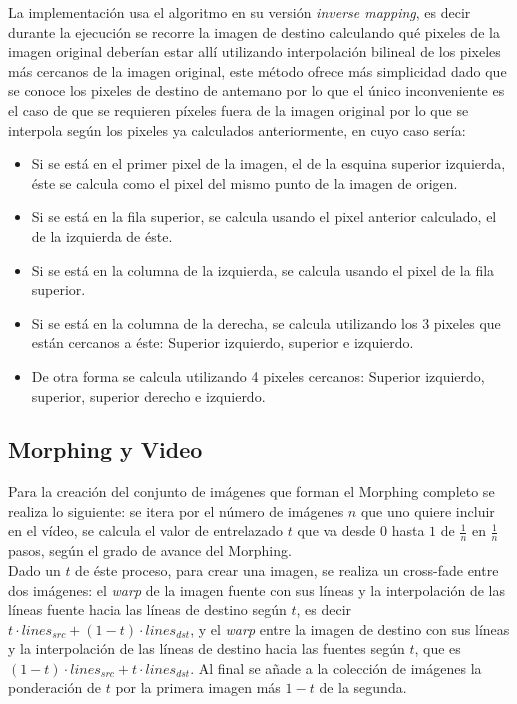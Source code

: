 \documentclass[conference]{IEEEtran}
\begin{document}
	La implementación usa el algoritmo en su versión \textit{inverse mapping}, es decir durante la ejecución se recorre la imagen de destino calculando qué pixeles de la imagen original deberían estar allí utilizando interpolación bilineal de los pixeles más cercanos de la imagen original, este método ofrece más simplicidad dado que se conoce los pixeles de destino de antemano por lo que el único inconveniente es el caso de que se requieren píxeles fuera de la imagen original por lo que se interpola según los pixeles ya calculados anteriormente, en cuyo caso sería:
		\begin{itemize}
               	\item Si se está en el primer pixel de la imagen, el de la esquina superior izquierda, éste se calcula como el pixel del mismo punto de la imagen de origen.
               	\item Si se está en la fila superior, se calcula usando el pixel anterior calculado, el de la izquierda de éste.
               	\item Si se está en la columna de la izquierda, se calcula usando el pixel de la fila superior.
               	\item Si se está en la columna de la derecha, se calcula utilizando los 3 pixeles que están cercanos a éste: Superior izquierdo, superior e izquierdo.
               	\item De otra forma se calcula utilizando 4 pixeles cercanos: Superior izquierdo, superior, superior derecho e izquierdo.
		\end{itemize}
	
	\subsection*{Morphing y Video}
	Para la creación del conjunto de imágenes que forman el Morphing completo se realiza lo siguiente: se itera por el número de imágenes $n$ que uno quiere incluir en el vídeo, se calcula el valor de entrelazado $t$ que va desde $0$ hasta $1$ de $\frac{1}{n}$ en $\frac{1}{n}$ pasos, según el grado de avance del Morphing. \\
	Dado un $t$ de éste proceso, para crear una imagen, se realiza un cross-fade entre dos imágenes: el \textit{warp} de la imagen fuente con sus líneas y la interpolación de las líneas fuente hacia las líneas de destino según $t$, es decir $t \cdot lines_{src} + (1 - t) \cdot lines_{dst}$, y el \textit{warp} entre la imagen de destino con sus líneas y la interpolación de las líneas de destino hacia las fuentes según $t$, que es $(1 - t) \cdot lines_{src} + t \cdot lines_{dst}$. Al final se añade a la colección de imágenes la ponderación de $t$ por la primera imagen más $1 - t$ de la segunda. \\
	
\end{document}
